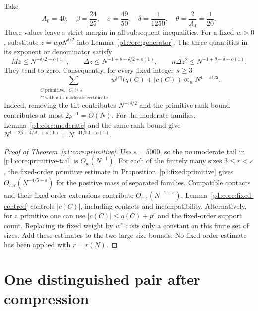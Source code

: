 Take
\begin{equation}
 A_0=40,\quad\beta=\frac{24}{25},\quad\sigma=\frac{49}{50},
 \quad\delta=\frac1{1250},\quad\theta=\frac2{A_0}=\frac1{20}.
 \label{p1:core:primitive-parameters}
\end{equation}
These values leave a strict margin in all subsequent inequalities.
For a fixed $w>0$, substitute $z=wpN^{\delta/2}$ into
Lemma~\ref{p1:core:generator}. The three quantities in its exponent
or denominator satisfy
\[
 Mz\le N^{-\delta/2+o(1)},\qquad
 \Delta z\le N^{-1+\theta+\delta/2+o(1)},\qquad
 n\Delta z^2\le N^{-1+\theta+\delta+o(1)}.
\]
They tend to zero. Consequently, for every fixed integer $s\ge3$,
\begin{equation}
 \sum_{\substack{C\ \mathrm{primitive},\ |C|\ge s\\
                         C\ \mathrm{without\ a\ moderate\ certificate}}}
 w^{|C|}\bigl(q(C)+|c(C)|\bigr)
 \ll_w N^{1-s\delta/2}.
 \label{p1:core:primitive-tail}
\end{equation}
Indeed, removing the tilt contributes $N^{-s\delta/2}$ and the
primitive rank bound contributes at most $2p^{-1}=O(N)$.
For the moderate families, Lemma~\ref{p1:core:moderate} and the same
rank bound give $N^{1-2\beta+4/A_0+o(1)}=N^{-41/50+o(1)}$.

\begin{proof}[Proof of Theorem~\ref{p1:core:primitive}]
Use $s=5000$, so the nonmoderate tail in
\eqref{p1:core:primitive-tail} is $O_w(N^{-1})$.
For each of the finitely many sizes $3\le r<s$, the fixed-order
primitive estimate in Proposition~\ref{p1:fixed:primitive} gives
$O_{r,\varepsilon}(N^{-4/5+\varepsilon})$
for the positive mass of separated families. Compatible contacts and
their fixed-order extensions contribute $O_{r,\varepsilon}(N^{-1+\varepsilon})$.
Lemma~\ref{p1:core:fixed-centred} controls $|c(C)|$,
including contacts and incompatibility. Alternatively, for a primitive
one can use $|c(C)|\le q(C)+p^r$ and the fixed-order support count.
Replacing its fixed weight by $w^r$ costs only a constant on this
finite set of sizes. Add these estimates to the two large-size bounds.
No fixed-order estimate has been applied with $r=r(N)$.
\end{proof}

\section{One distinguished pair after compression}
\label{p1:core:compression-section}

